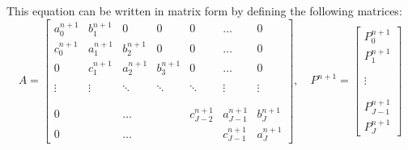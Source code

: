 This equation can be written in matrix form by defining the following matrices:
\begin{equation}
A =
\begin{bmatrix}
	a_0^{n+1} & b_1^{n+1} & 0                & 0                & 0        & \dots                                 & 0        \\
	c_0^{n+1} & a_1^{n+1} & b_2^{n+1} & 0                & 0        & \dots                                 & 0        \\
	0                & c_1^{n+1} & a_2^{n+1} & b_3^{n+1}   & 0        & \dots                                 & 0        \\
			     &                   &                   &                  &           &                                         &           \\
	\vdots         & \vdots         & \ddots         & \ddots         & \ddots & \vdots                              & \vdots \\
			     &                   &                   &                  &           &                                         &           \\
			     &                   &                   &                  &           &                                         &           \\
	0                &                   & \dots           &                   &  c_{J-2}^{n+1} & a_{J-1}^{n+1}  & b_J^{n+1} \\
	0                &                   & \dots           &                   &                         &  c_{J-1}^{n+1} & a_J^{n+1}
\end{bmatrix}
,\quad P^{n+1} =
\begin{bmatrix}
P_0^{n+1}       \\
P_1^{n+1}	     \\
                        \\
                        \\
\vdots               \\
                        \\
                        \\
P_{J-1}^{n+1} \\
P_J^{n+1}
\end{bmatrix}
\end{equation}

